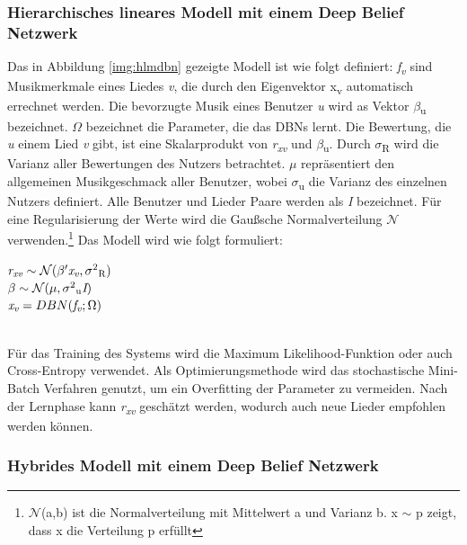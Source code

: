 \documentclass[twosided,a4,10pt]{article}
\begin{document}
\begin{multicols}{2}
		\subsubsection{Hierarchisches lineares Modell mit einem Deep Belief Netzwerk}
		Das in Abbildung \ref{img:hlmdbn} gezeigte Modell ist wie folgt definiert: \textit{f\textsubscript{v}} sind Musikmerkmale eines Liedes \textit{v}, die durch den Eigenvektor x\textsubscript{v} automatisch errechnet werden. Die bevorzugte Musik eines Benutzer \textit{u} wird as Vektor $\beta$\textsubscript{u} bezeichnet. $\Omega$ bezeichnet die Parameter, die das DBNs lernt. Die Bewertung, die \textit{u} einem Lied \textit{v} gibt, ist eine Skalarprodukt von \textit{r\textsubscript{xv}} und $\beta$\textsubscript{u}. Durch $\sigma$\textsubscript{R} wird die Varianz aller Bewertungen des Nutzers betrachtet. $\mu$ repräsentiert den allgemeinen Musikgeschmack aller Benutzer, wobei $\sigma$\textsubscript{u} die Varianz des einzelnen Nutzers definiert. Alle Benutzer und Lieder Paare werden als \textit{I} bezeichnet. Für eine Regularisierung der Werte wird die Gaußsche Normalverteilung $\mathcal{N}$ verwenden.\footnote[7]{$\mathcal{N}$(a,b) ist die Normalverteilung mit Mittelwert a und Varianz b. x $\sim$ p zeigt, dass x die Verteilung p erfüllt} \cite{wang}\newline Das Modell wird wie folgt formuliert:\newline\\
		\begin{minipage}{0.45\textwidth}
			\centering
			$\textit{r\textsubscript{xv}}\sim\mathcal{N}(\beta'\textit{x\textsubscript{v}},\sigma\textsuperscript{2}\textsubscript{R})$\\
			$\beta\sim\mathcal{N}(\mu,\sigma\textsuperscript{2}\textsubscript{u}\textit{I})$\\
			$\textit{x\textsubscript{v}} = DBN(\textit{f\textsubscript{v}};\Omega)$
		\end{minipage}\newline\\
		Für das Training des Systems wird die Maximum Likelihood-Funktion oder auch Cross-Entropy verwendet. Als Optimierungsmethode wird das stochastische Mini-Batch Verfahren genutzt, um ein Overfitting der Parameter zu vermeiden. Nach der Lernphase kann \textit{r\textsubscript{xv}} geschätzt werden, wodurch auch neue Lieder empfohlen werden können. \cite{wang}
		
		\subsubsection{Hybrides Modell mit einem Deep Belief Netzwerk}
		

\end{multicols}
\end{document}
